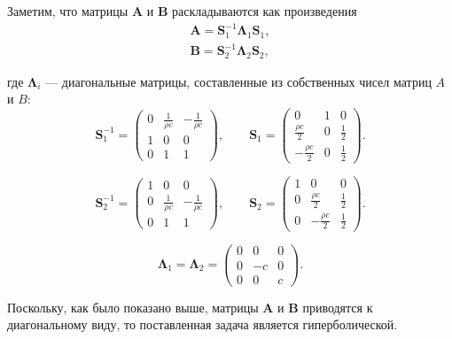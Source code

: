 Заметим, что матрицы $\pmb{A}$ и $\pmb{B}$ раскладываются как произведения
\begin{gather*}
		\pmb{A} = \pmb{S}_1^{-1} \pmb{\Lambda}_1 \pmb{S}_1 , \\
		\pmb{B} = \pmb{S}_2^{-1} \pmb{\Lambda}_2 \pmb{S}_2 ,
\end{gather*}

\noindent где  $\pmb{\Lambda}_i$ --- диагональные матрицы, составленные из собственных чисел матриц $A$ и $B$:
\begin{equation*}
	\pmb{S}_1^{-1} = 
	\begin{pmatrix}
		0 & \frac{1}{\rho c} & -\frac{1}{\rho c} \\
		1 & 0 & 0 \\
		0 & 1 & 1			
    \end{pmatrix} 
    ,\qquad
	\pmb{S}_1 = 
	\begin{pmatrix}
		0 & 1 & 0 \\
		\frac{\rho c}{2} & 0 & \frac{1}{2} \\
		-\frac{\rho c}{2} & 0 & \frac{1}{2}		
 	 \end{pmatrix}
 	 .
\end{equation*}

\begin{equation*}
	\pmb{S}_2^{-1} = 
	\begin{pmatrix}
		1 & 0 & 0 \\
		0 & \frac{1}{\rho c} & -\frac{1}{\rho c} \\
		0 & 1 & 1			
 	\end{pmatrix} 
 	, \qquad
	\pmb{S}_2 = 
	\begin{pmatrix}
		1 & 0 & 0 \\
		0 & \frac{\rho c}{2} & \frac{1}{2} \\
		0 & -\frac{\rho c}{2} & \frac{1}{2}	
 	\end{pmatrix}
 	.
\end{equation*}

\begin{equation*}
	\pmb{\Lambda}_1 = \pmb{\Lambda}_2 = 
	\begin{pmatrix}
		0 & 0 & 0 \\
		0 & -c & 0 \\
		0 & 0 & c				
	\end{pmatrix}
	.
\end{equation*}

\noindent Поскольку, как было показано выше, матрицы $\pmb{A}$ и $\pmb{B}$ приводятся к диагональному виду, то поставленная задача является гиперболической.

